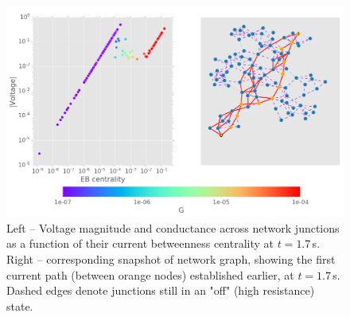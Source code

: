 \documentclass[fleqn,10pt,  amsmath,amssymb,aps]{wlscirep}
\begin{document}
\begin{figure}[h]
	\centering
	\includegraphics[width=0.8\linewidth]{figure/ebc+nw}
	\caption{Left -- Voltage magnitude and conductance across network junctions as a function of their current betweenness centrality at $t = 1.7\,$s. Right -- corresponding snapshot of network graph, showing the first current path (between orange nodes) established earlier, at $t = 1.7\,$s. Dashed edges denote junctions still in an "off" (high resistance) state.}
	\label{fig:ebc+nw}
\end{figure}





\end{document}
